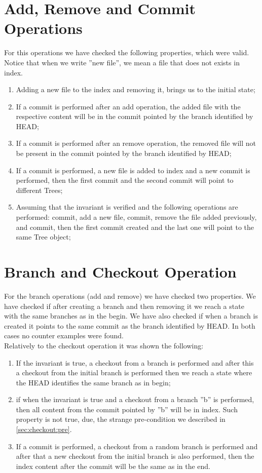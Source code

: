\section{Add, Remove and Commit Operations}
For this operations we have checked the following properties, which
were valid. Notice that when we write ''new file'', we mean a file
that does not exists in index.
\begin{enumerate}
   \item Adding a new file to the index and removing it, brings us to the
   initial state;
   \item If a commit is performed after an add operation, the added
   file with the respective content will be in the commit pointed 
   by the branch identified by HEAD;
   \item If a commit is performed after an remove operation, the
   removed file will not be present in the commit pointed by the
   branch identified by HEAD;
   \item If a commit is performed, a new file is added to index and a
   new commit is performed, then the first commit and the second
   commit will point to different Trees;
   \item Assuming that the invariant is verified and the following operations are
   performed: commit, add a new file, commit, remove the file added
   previously, and commit, then the first commit created and the last one
   will point to the same Tree object;
\end{enumerate}


\section{Branch and Checkout Operation}
For the branch operations (add and remove) we have checked two
properties. We have checked if after creating a branch and then
removing it we reach a state with the same branches as in the begin.
We have also checked if when a branch is created it points to the same
commit as the branch identified by HEAD. In both cases no counter
examples were found.\\

Relatively to the checkout operation it was shown the following:
\begin{enumerate}
   \item If the invariant is true, a checkout from a branch is
   performed and after this a checkout from the initial branch is
   performed then we reach a state where the HEAD identifies the same
   branch as in begin;
   \item if when the invariant is
   true and a checkout from a branch ''b'' is performed, then all content
   from the commit pointed by ''b'' will be in index. Such property is
   not true, due, the strange pre-condition we described in
   \ref{sec:checkout:pre}.
   \item If a commit is performed, a checkout from a random branch is
   performed and after that a new checkout from the initial branch is also
   performed, then the index content after the commit will be the same
   as in the end.
\end{enumerate}

